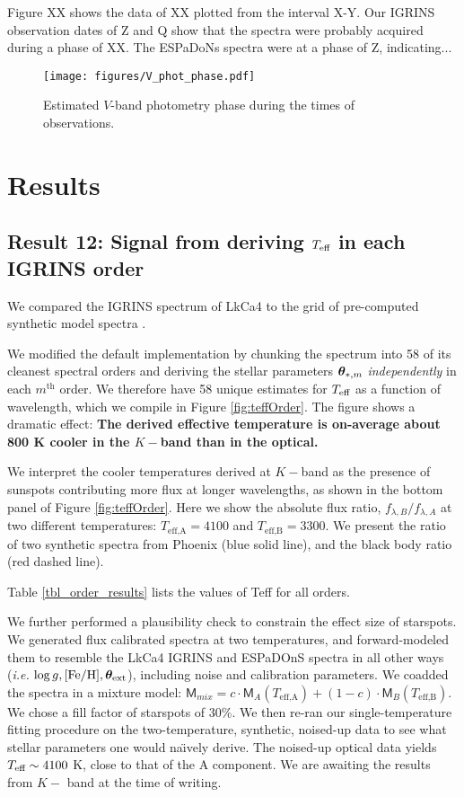 \documentclass[onecolumn]{emulateapj}%
\newcommand{\name}{LkCa4 }
\begin{document}
Figure XX shows the data of XX plotted from the interval X-Y.  Our IGRINS observation dates of Z and Q show that the spectra were probably acquired during a phase of XX.  The ESPaDoNs spectra were at a phase of Z, indicating...

\begin{figure*}
	\centering
	\texttt{[image: figures/V\_phot\_phase.pdf]}
	\caption{Estimated $V$-band photometry phase during the times of observations.}
	\label{fig:PhotPhase}
\end{figure*}

\section{Results}

\subsection{Result 12: Signal from deriving $T_\textrm{eff}$ in each IGRINS order}

We compared the IGRINS spectrum of \name to the \PHOENIX grid of pre-computed synthetic model spectra \citep{2013A&A...553A...6H}.  

We modified the default implementation by chunking the spectrum into 58 of its cleanest spectral orders and deriving the stellar parameters ${\bm \theta}_{\ast,m}$ \emph{independently} in each $m^{\mathrm{th}}$ order.  We therefore have 58 unique estimates for $T_\textrm{eff}$ as a function of wavelength, which we compile in Figure \ref{fig:teffOrder}.  The figure shows a dramatic effect: \textbf{The derived effective temperature is on-average about 800 K cooler in the $K-$band than in the optical.}  

We interpret the cooler temperatures derived at $K-$band as the presence of sunspots contributing more flux at longer wavelengths, as shown in the bottom panel of Figure \ref{fig:teffOrder}.  Here we show the absolute flux ratio, $f_{\lambda, B} / f_{\lambda, A}$ at two different temperatures: $T_\textrm{eff,A} = 4100$ and $T_\textrm{eff,B} = 3300$.  We present the ratio of two synthetic spectra from Phoenix (blue solid line), and the black body ratio (red dashed line).  

Table \ref{tbl_order_results} lists the values of Teff for all orders.



We further performed a plausibility check to constrain the effect size of starspots.  We generated flux calibrated spectra at two temperatures, and forward-modeled them to resemble the LkCa4 IGRINS and ESPaDOnS spectra in all other ways (\emph{i.e.} $\log g, [{\rm Fe}/{\rm H}], {\bm \theta}_{\rm ext}$), including noise and calibration parameters.  We coadded the spectra in a mixture model:  $ \mathsf{M}_{mix} = c \cdot \mathsf{M}_A(T_\textrm{eff,A}) + (1-c) \cdot \mathsf{M}_B(T_\textrm{eff,B})$.  We chose a fill factor of starspots of 30\%.  We then re-ran our single-temperature fitting procedure on the two-temperature, synthetic, noised-up data to see what stellar parameters one would na\"{\i}vely derive.  The noised-up optical data yields $T_\textrm{eff} \sim 4100$ K, close to that of the A component.  We are awaiting the results from $K-$ band at the time of writing.
\end{document}
